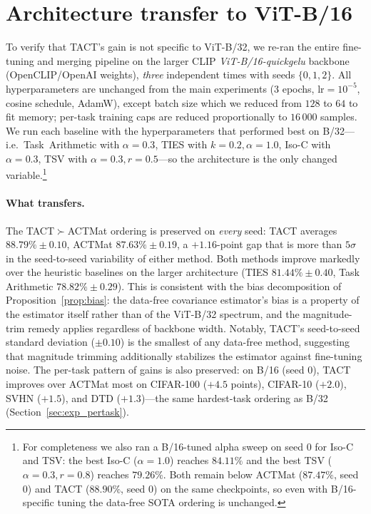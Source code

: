 \documentclass{article}
\theoremstyle{plain}
\theoremstyle{definition}
\theoremstyle{remark}
\begin{document}
\section{Architecture transfer to ViT-B/16}
\label{app:b16}

To verify that TACT's gain is not specific to ViT-B/32, we re-ran the entire fine-tuning and merging pipeline on the larger CLIP \emph{ViT-B/16-quickgelu} backbone (OpenCLIP/OpenAI weights), \emph{three} independent times with seeds $\{0,1,2\}$. All hyperparameters are unchanged from the main experiments (3 epochs, $\mathrm{lr}{=}10^{-5}$, cosine schedule, AdamW), except batch size which we reduced from $128$ to $64$ to fit memory; per-task training caps are reduced proportionally to $16\,000$ samples. We run each baseline with the hyperparameters that performed best on B/32---i.e.\ Task~Arithmetic with $\alpha=0.3$, TIES with $k=0.2,\alpha=1.0$, Iso-C with $\alpha=0.3$, TSV with $\alpha=0.3, r=0.5$---so the architecture is the only changed variable.\footnote{For completeness we also ran a B/16-tuned alpha sweep on seed 0 for Iso-C and TSV: the best Iso-C ($\alpha=1.0$) reaches $84.11\%$ and the best TSV ($\alpha=0.3, r=0.8$) reaches $79.26\%$. Both remain below ACTMat ($87.47\%$, seed 0) and TACT ($88.90\%$, seed 0) on the same checkpoints, so even with B/16-specific tuning the data-free SOTA ordering is unchanged.}



\paragraph{What transfers.}
The TACT$\succ$ACTMat ordering is preserved on \emph{every} seed: TACT averages $88.79\% \pm 0.10$, ACTMat $87.63\% \pm 0.19$, a $+1.16$-point gap that is more than $5\sigma$ in the seed-to-seed variability of either method. Both methods improve markedly over the heuristic baselines on the larger architecture (TIES $81.44\% \pm 0.40$, Task Arithmetic $78.82\% \pm 0.29$). This is consistent with the bias decomposition of Proposition~\ref{prop:bias}: the data-free covariance estimator's bias is a property of the estimator itself rather than of the ViT-B/32 spectrum, and the magnitude-trim remedy applies regardless of backbone width. Notably, TACT's seed-to-seed standard deviation ($\pm 0.10$) is the smallest of any data-free method, suggesting that magnitude trimming additionally stabilizes the estimator against fine-tuning noise. The per-task pattern of gains is also preserved: on B/16 (seed 0), TACT improves over ACTMat most on CIFAR-100 ($+4.5$ points), CIFAR-10 ($+2.0$), SVHN ($+1.5$), and DTD ($+1.3$)---the same hardest-task ordering as B/32 (Section~\ref{sec:exp_pertask}).
\end{document}
